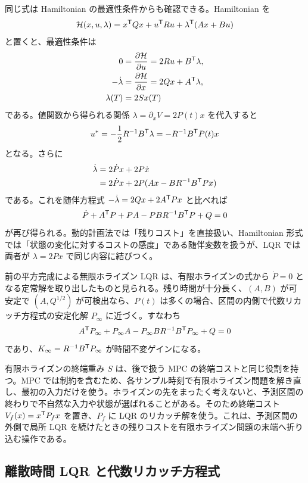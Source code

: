 同じ式は Hamiltonian の最適性条件からも確認できる。Hamiltonian を
\begin{equation}
  \mathcal{H}(x,u,\lambda)
  =x^{\mathsf{T}} Qx+u^{\mathsf{T}} Ru+\lambda^{\mathsf{T}}(Ax+Bu)
\end{equation}
と置くと、最適性条件は
\begin{align}
  0&=\frac{\partial \mathcal{H}}{\partial u}
    =2Ru+B^{\mathsf{T}}\lambda,\\
  -\dot{\lambda}&=\frac{\partial \mathcal{H}}{\partial x}
    =2Qx+A^{\mathsf{T}}\lambda,\\
  \lambda(T)&=2Sx(T)
\end{align}
である。値関数から得られる関係 $\lambda=\partial_x V=2P(t)x$ を代入すると
\begin{equation}
  u^*=-\frac{1}{2}R^{-1}B^{\mathsf{T}}\lambda
  =-R^{-1}B^{\mathsf{T}} P(t)x
\end{equation}
となる。さらに
\begin{align}
  \dot{\lambda}
  &=2\dot{P}x+2P\dot{x}\\
  &=2\dot{P}x+2P(Ax-BR^{-1}B^{\mathsf{T}} Px)
\end{align}
である。これを随伴方程式 $-\dot{\lambda}=2Qx+2A^{\mathsf{T}} Px$ と比べれば
\begin{equation}
  \dot{P}+A^{\mathsf{T}} P+PA-PBR^{-1}B^{\mathsf{T}} P+Q=0
\end{equation}
が再び得られる。動的計画法では「残りコスト」を直接扱い、Hamiltonian 形式では「状態の変化に対するコストの感度」である随伴変数を扱うが、LQR では両者が $\lambda=2Px$ で同じ内容に結びつく。

前の平方完成による無限ホライズン LQR は、有限ホライズンの式から $\dot{P}=0$ となる定常解を取り出したものと見られる。残り時間が十分長く、$(A,B)$ が可安定で $(A,Q^{1/2})$ が可検出なら、$P(t)$ は多くの場合、区間の内側で代数リカッチ方程式の安定化解 $P_\infty$ に近づく。すなわち
\begin{equation}
  A^{\mathsf{T}} P_\infty+P_\infty A
  -P_\infty BR^{-1}B^{\mathsf{T}} P_\infty+Q=0
\end{equation}
であり、$K_\infty=R^{-1}B^{\mathsf{T}} P_\infty$ が時間不変ゲインになる。

有限ホライズンの終端重み $S$ は、後で扱う MPC の終端コストと同じ役割を持つ。MPC では制約を含むため、各サンプル時刻で有限ホライズン問題を解き直し、最初の入力だけを使う。ホライズンの先をまったく考えないと、予測区間の終わりで不自然な入力や状態が選ばれることがある。そのため終端コスト $V_f(x)=x^{\mathsf{T}} P_f x$ を置き、$P_f$ に LQR のリカッチ解を使う。これは、予測区間の外側で局所 LQR を続けたときの残りコストを有限ホライズン問題の末端へ折り込む操作である。

\subsection{離散時間 LQR と代数リカッチ方程式}

